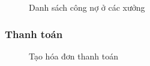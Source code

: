 \begin{figure}[H]
    \begin{center}
        \caption{Danh sách công nợ ở các xưởng}
        \label{mockup_debt}
    \end{center}
\end{figure}

\subsubsection{Thanh toán}

\begin{figure}[H]
    \begin{center}
        \caption{Tạo hóa đơn thanh toán}
        \label{mockup_payment}
    \end{center}
\end{figure}